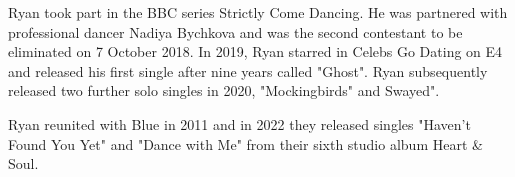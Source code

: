 \documentclass{SkripsiUnesa}
\begin{document}
\Inti











\nocite{*}

\Glosarium
\BukaLampiran

\UjiAhli



Ryan took part in the BBC series Strictly Come Dancing. He was partnered with professional dancer Nadiya Bychkova and was the second contestant to be eliminated on 7 October 2018. In 2019, Ryan starred in Celebs Go Dating on E4 and released his first single after nine years called "Ghost". Ryan subsequently released two further solo singles in 2020, "Mockingbirds" and Swayed".

Ryan reunited with Blue in 2011 and in 2022 they released singles "Haven't Found You Yet" and "Dance with Me" from their sixth studio album Heart \& Soul.
\end{document}

